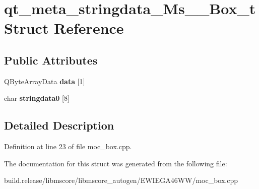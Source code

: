 \hypertarget{structqt__meta__stringdata___ms_____box__t}{}\section{qt\+\_\+meta\+\_\+stringdata\+\_\+\+Ms\+\_\+\+\_\+\+Box\+\_\+t Struct Reference}
\label{structqt__meta__stringdata___ms_____box__t}
\subsection*{Public Attributes}
\begin{DoxyCompactItemize}
\item 
\mbox{\label{structqt__meta__stringdata___ms_____box__t_aa6ab817f935a96e2c2f42070f6576adb}} 
Q\+Byte\+Array\+Data {\bfseries data} \mbox{[}1\mbox{]}
\item 
\mbox{\label{structqt__meta__stringdata___ms_____box__t_af90ccdd964c89c98a17aa069ab37f443}} 
char {\bfseries stringdata0} \mbox{[}8\mbox{]}
\end{DoxyCompactItemize}


\subsection{Detailed Description}


Definition at line 23 of file moc\+\_\+box.\+cpp.



The documentation for this struct was generated from the following file\+:\begin{DoxyCompactItemize}
\item 
build.\+release/libmscore/libmscore\+\_\+autogen/\+E\+W\+I\+E\+G\+A46\+W\+W/moc\+\_\+box.\+cpp\end{DoxyCompactItemize}
